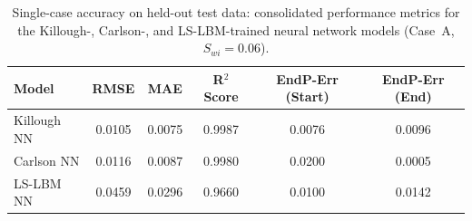 %


\begin{table}[h]
\centering
\caption{Single-case accuracy on held-out test data: consolidated performance
metrics for the Killough-, Carlson-, and LS-LBM-trained neural network models
(Case~A, $S_{wi}=0.06$).}
\label{tab:accuracy}
\begin{tabular}{lccccc}
\hline
\textbf{Model} & \textbf{RMSE} & \textbf{MAE} & \textbf{R$^2$ Score}
  & \textbf{EndP-Err (Start)} & \textbf{EndP-Err (End)} \\
\hline
Killough NN & 0.0105 & 0.0075 & 0.9987 & 0.0076 & 0.0096 \\
Carlson NN  & 0.0116 & 0.0087 & 0.9980 & 0.0200 & 0.0005 \\
LS-LBM NN  & 0.0459 & 0.0296 & 0.9660 & 0.0100 & 0.0142 \\
\hline
\end{tabular}
\end{table}

%

